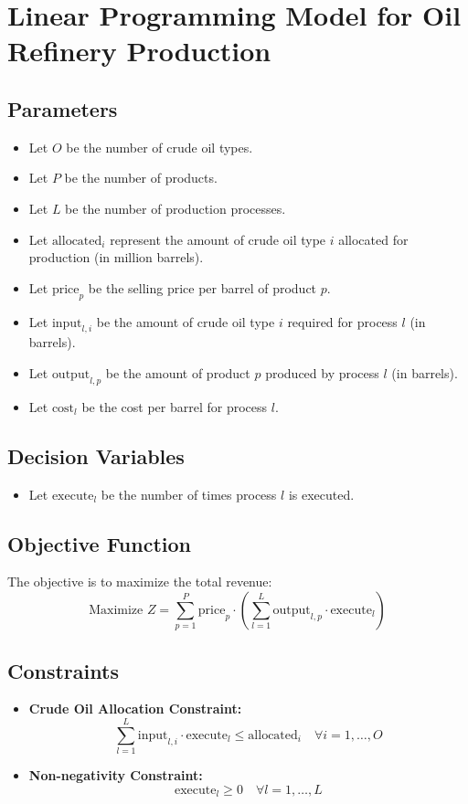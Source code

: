 \documentclass{article}
\begin{document}
\section*{Linear Programming Model for Oil Refinery Production}

\subsection*{Parameters}
\begin{itemize}
    \item Let \( O \) be the number of crude oil types.
    \item Let \( P \) be the number of products.
    \item Let \( L \) be the number of production processes.
    \item Let \( \text{allocated}_i \) represent the amount of crude oil type \( i \) allocated for production (in million barrels).
    \item Let \( \text{price}_p \) be the selling price per barrel of product \( p \).
    \item Let \( \text{input}_{l,i} \) be the amount of crude oil type \( i \) required for process \( l \) (in barrels).
    \item Let \( \text{output}_{l,p} \) be the amount of product \( p \) produced by process \( l \) (in barrels).
    \item Let \( \text{cost}_l \) be the cost per barrel for process \( l \).
\end{itemize}

\subsection*{Decision Variables}
\begin{itemize}
    \item Let \( \text{execute}_l \) be the number of times process \( l \) is executed.
\end{itemize}

\subsection*{Objective Function}
The objective is to maximize the total revenue:
\[
\text{Maximize } Z = \sum_{p=1}^{P} \text{price}_p \cdot \left( \sum_{l=1}^{L} \text{output}_{l,p} \cdot \text{execute}_l \right)
\]

\subsection*{Constraints}
\begin{itemize}
    \item \textbf{Crude Oil Allocation Constraint:}
    \[
    \sum_{l=1}^{L} \text{input}_{l,i} \cdot \text{execute}_l \leq \text{allocated}_i \quad \forall i = 1, \ldots, O
    \]
    
    \item \textbf{Non-negativity Constraint:}
    \[
    \text{execute}_l \geq 0 \quad \forall l = 1, \ldots, L
    \]
\end{itemize}
\end{document}
